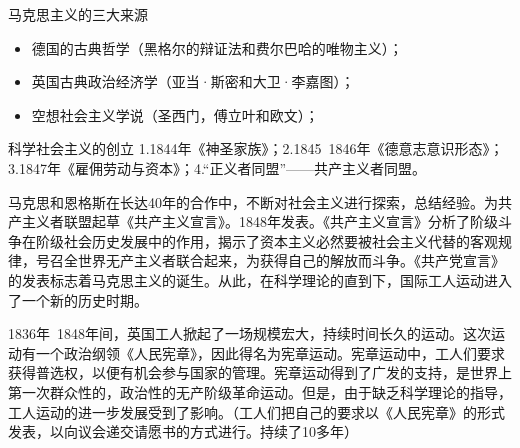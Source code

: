 马克思主义的三大来源

\begin{itemize}
    \item 德国的古典哲学（黑格尔的辩证法和费尔巴哈的唯物主义）；
    \item 英国古典政治经济学（亚当·斯密和大卫·李嘉图）；
    \item 空想社会主义学说（圣西门，傅立叶和欧文）；
\end{itemize}

科学社会主义的创立 
1.1844年《神圣家族》；2.1845~1846年《德意志意识形态》；3.1847年《雇佣劳动与资本》；4.“正义者同盟”——共产主义者同盟。

马克思和恩格斯在长达40年的合作中，不断对社会主义进行探索，总结经验。为共产主义者联盟起草《共产主义宣言》。1848年发表。《共产主义宣言》分析了阶级斗争在阶级社会历史发展中的作用，揭示了资本主义必然要被社会主义代替的客观规律，号召全世界无产主义者联合起来，为获得自己的解放而斗争。《共产党宣言》的发表标志着马克思主义的诞生。从此，在科学理论的直到下，国际工人运动进入了一个新的历史时期。

1836年~1848年间，英国工人掀起了一场规模宏大，持续时间长久的运动。这次运动有一个政治纲领《人民宪章》，因此得名为宪章运动。宪章运动中，工人们要求获得普选权，以便有机会参与国家的管理。宪章运动得到了广发的支持，是世界上第一次群众性的，政治性的无产阶级革命运动。但是，由于缺乏科学理论的指导，工人运动的进一步发展受到了影响。（工人们把自己的要求以《人民宪章》的形式发表，以向议会递交请愿书的方式进行。持续了10多年）




